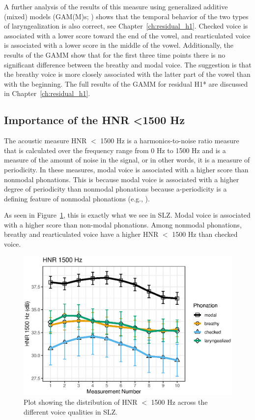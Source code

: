 A further analysis of the results of this measure using generalized additive (mixed) models (GAM(M)s; \cite{hastieGeneralizedAdditiveModels1986,woodGeneralizedAdditiveModels2017,soskuthyGeneralisedAdditiveMixed2017,wielingAnalyzingDynamicPhonetic2018}) shows that the temporal behavior of the two types of laryngealization is also correct, see Chapter~\ref{ch:residual_h1}. Checked voice is associated with a lower score toward the end of the vowel, and rearticulated voice is associated with a lower score in the middle of the vowel. Additionally, the results of the GAMM show that for the first three time points there is no significant difference between the breathy and modal voice. The suggestion is that the breathy voice is more closely associated with the latter part of the vowel than with the beginning. The full results of the GAMM for residual H1* are discussed in Chapter~\ref{ch:residual_h1}.

\subsection{Importance of the HNR \textless 1500 Hz} \label{sec:bagging_hnr}

The acoustic measure HNR $<$ 1500 Hz is a harmonics-to-noise ratio measure that is calculated over the frequency range from 0 Hz to 1500 Hz and is a measure of the amount of noise in the signal, or in other words, it is a measure of periodicity. In these measures, modal voice is associated with a higher score than nonmodal phonations. This is because modal voice is associated with a higher degree of periodicity than nonmodal phonations because a-periodicity is a defining feature of nonmodal phonations (e.g., \cite{hillenbrandAcousticCorrelatesBreathy1996,blankenshipTimeCourseBreathiness1997,kentVoiceQualityMeasurement1999}).

As seen in Figure~\ref{fig:hnr1500}, this is exactly what we see in SLZ. Modal voice is associated with a higher score than non-modal phonations. Among nonmodal phonations, breathy and rearticulated voice have a higher HNR $<$ 1500 Hz than checked voice. 

\begin{figure}[h!]
    \centering
    \includegraphics[width = 0.9\linewidth]{images/slz_hnr15.eps}
    \caption{Plot showing the distribution of HNR $<$ 1500 Hz across the different voice qualities in SLZ.}
    \label{fig:hnr1500}
\end{figure}

